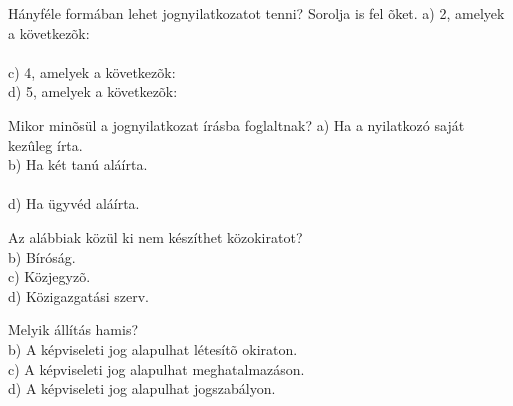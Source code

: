 \begin{frame}

\begin{tcolorbox}[title={141. Kérdés}]
Hányféle formában lehet jognyilatkozatot tenni? Sorolja is fel õket.
\tcblower
a) 2, amelyek a következõk:\\
\\
c) 4, amelyek a következõk:\\
d) 5, amelyek a következõk:
\end{tcolorbox}

\begin{tcolorbox}[title={142. Kérdés}]
Mikor minõsül a jognyilatkozat írásba foglaltnak?
\tcblower
a) Ha a nyilatkozó saját kezûleg írta.\\
b) Ha két tanú aláírta.\\
\\
d) Ha ügyvéd aláírta.
\end{tcolorbox}

\begin{tcolorbox}[title={143. Kérdés}]
Az alábbiak közül ki nem készíthet közokiratot?
\tcblower
{}\\
b) Bíróság.\\
c) Közjegyzõ.\\
d) Közigazgatási szerv.
\end{tcolorbox}

\begin{tcolorbox}[title={144. Kérdés}]
Melyik állítás hamis?
\tcblower
{}\\
b) A képviseleti jog alapulhat létesítõ okiraton.\\
c) A képviseleti jog alapulhat meghatalmazáson.\\
d) A képviseleti jog alapulhat jogszabályon. 
\end{tcolorbox}

\end{frame}


